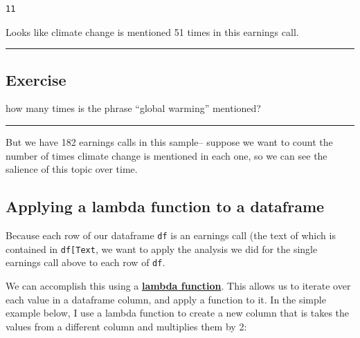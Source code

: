 \documentclass[
  letterpaper,
  DIV=11,
  numbers=noendperiod]{scrreprt}
\begin{document}
\begin{verbatim}
11
\end{verbatim}

Looks like climate change is mentioned 51 times in this earnings call.

\begin{center}\rule{0.5\linewidth}{0.5pt}\end{center}

\hypertarget{exercise-8}{%
\subsection{Exercise}\label{exercise-8}}

how many times is the phrase ``global warming'' mentioned?

\begin{center}\rule{0.5\linewidth}{0.5pt}\end{center}

But we have 182 earnings calls in this sample-- suppose we want to count
the number of times climate change is mentioned in each one, so we can
see the salience of this topic over time.

\hypertarget{applying-a-lambda-function-to-a-dataframe}{%
\subsection{Applying a lambda function to a
dataframe}\label{applying-a-lambda-function-to-a-dataframe}}

Because each row of our dataframe \texttt{df} is an earnings call (the
text of which is contained in
\texttt{df{[}\textquotesingle{}Text\textquotesingle{}{]}}, we want to
apply the analysis we did for the single earnings call above to each row
of \texttt{df}.

We can accomplish this using a
\href{https://www.w3schools.com/python/python_lambda.asp}{\textbf{lambda
function}}. This allows us to iterate over each value in a dataframe
column, and apply a function to it. In the simple example below, I use a
lambda function to create a new column that is takes the values from a
different column and multiplies them by 2:
\end{document}
